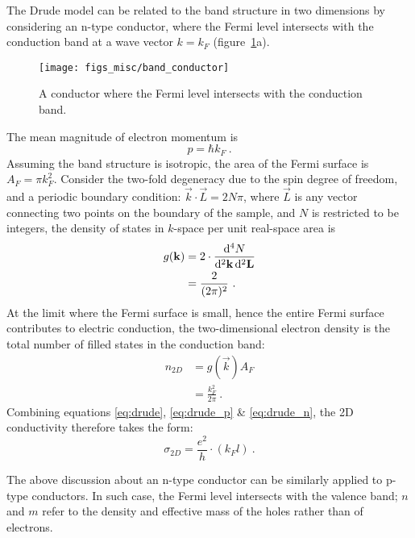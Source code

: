 The Drude model can be related to the band structure in two dimensions by considering an n-type conductor, where the Fermi level intersects with the conduction band at a wave vector $k = k_F$ (figure~\ref{fig:band_conductor}a). %
\begin{figure}[ht]%
    \centering%
    \texttt{[image: figs\_misc/band\_conductor]}%
    \caption[Band structure of an n-type conductor]{\label{fig:band_conductor}A conductor where the Fermi level intersects with the conduction band.}%
\end{figure}%
%
The mean magnitude of electron momentum is
\begin{equation}
    p = \hbar k_F~.\label{eq:drude_p}
\end{equation}%
Assuming the band structure is isotropic, the area of the Fermi surface is $A_F = \pi k_F^2$. Consider the two-fold degeneracy due to the spin degree of freedom, and a periodic boundary condition: $\vec{k} \cdot \vec{L} = 2N\pi$, where $\vec{L}$ is any vector connecting two points on the boundary of the sample, and $N$ is restricted to be integers, the density of states in $k$-space per unit real-space area is%
\begin{align}
    g(\mathbf{k}) &= 2\cdot\frac{\mathop{}\!\mathrm{d}^4N}{\mathop{}\!\mathrm{d}^2 \mathbf{k} \mathop{}\!\mathrm{d}^2 \mathbf{L}}\nonumber\\
        & = \frac{2}{(2\pi)^2}~.
\end{align}%
At the limit where the Fermi surface is small, hence the entire Fermi surface contributes to electric conduction, the two-dimensional electron density is the total number of filled states in the conduction band:%
\begin{align}
    n_{2D} &= g(\vec{k}) A_F\nonumber\\
        &= \frac{k_F^2}{2\pi}~.\label{eq:drude_n}
\end{align}%
Combining equations \ref{eq:drude}, \ref{eq:drude_p} \& \ref{eq:drude_n}, the 2D conductivity therefore takes the form:
\begin{equation}
    \sigma_{2D} = \frac{e^2}{h} \cdot (k_F l)~.\label{eq:drude_2d}
\end{equation}%

The above discussion about an n-type conductor can be similarly applied to p-type conductors. In such case, the Fermi level intersects with the valence band; $n$ and $m$ refer to the density and effective mass of the holes rather than of electrons.

